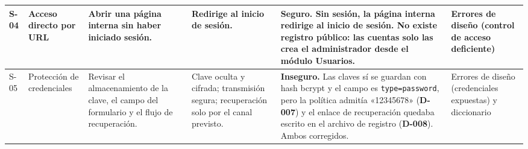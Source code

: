 \begin{landscape}
\begin{xltabular}{\linewidth}{|C{1.1cm}|L{3.1cm}|L{4.7cm}|L{3.8cm}|Y|L{4.1cm}|}
  S-04 & Acceso directo por URL & Abrir una página interna sin haber iniciado sesión. & Redirige al inicio de sesión. & \textbf{Seguro.} Sin sesión, la página interna redirige al inicio de sesión. No existe registro público: las cuentas solo las crea el administrador desde el módulo Usuarios. & Errores de diseño (control de acceso deficiente) \\ \hline

  S-05 & Protección de credenciales & Revisar el almacenamiento de la clave, el campo del formulario y el flujo de recuperación. & Clave oculta y cifrada; transmisión segura; recuperación solo por el canal previsto. & \textbf{Inseguro.} Las claves sí se guardan con hash bcrypt y el campo es \texttt{type=password}, pero la política admitía «12345678» (\textbf{D-007}) y el enlace de recuperación quedaba escrito en el archivo de registro (\textbf{D-008}). Ambos corregidos. & Errores de diseño (credenciales expuestas) y diccionario \\
\end{xltabular}
\endgroup
\end{landscape}
